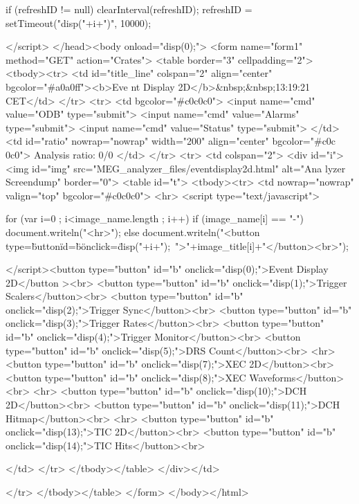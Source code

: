 \begin{DoxyCode}
{    if (refreshID != null)
      clearInterval(refreshID);
    refreshID = setTimeout("disp("+i+")", 10000);
  }
  
  </script>
  </head><body onload="disp(0);">
    <form name="form1" method="GET" action="Crates">
      <table border="3" cellpadding="2">
        <tbody><tr>
          <td id="title_line" colspan="2" align="center" bgcolor="#a0a0ff"><b>Eve
      nt Display 2D</b>&nbsp;&nbsp;13:19:21  CET</td>
        </tr>
        <tr>
          <td bgcolor="#c0c0c0">
            <input name="cmd" value="ODB" type="submit">
            <input name="cmd" value="Alarms" type="submit">
            <input name="cmd" value="Status" type="submit">
          </td>
          <td id="ratio" nowrap="nowrap" width="200" align="center" bgcolor="#c0c
      0c0">
            Analysis ratio: 0/0
          </td>
        </tr>  
        <tr>
          <td colspan="2">
            <div id="i">
              <img id="img" src="MEG_analyzer_files/eventdisplay2d.html" alt="Ana
      lyzer Screendump" border="0">
              <table id="t">
                <tbody><tr>
                  <td nowrap="nowrap" valign="top" bgcolor="#c0c0c0">
                    <hr>
<script type="text/javascript">

  for (var i=0 ; i<image_name.length ; i++)
    if (image_name[i] == "-")
       document.writeln("<hr>");
    else
       document.writeln("<button type=\"button\" id=\"b\" onclick=\"disp("+i+");\
      ">"+image_title[i]+"</button><br>");

</script><button type="button" id="b" onclick="disp(0);">Event Display 2D</button
      ><br>
<button type="button" id="b" onclick="disp(1);">Trigger Scalers</button><br>
<button type="button" id="b" onclick="disp(2);">Trigger Sync</button><br>
<button type="button" id="b" onclick="disp(3);">Trigger Rates</button><br>
<button type="button" id="b" onclick="disp(4);">Trigger Monitor</button><br>
<button type="button" id="b" onclick="disp(5);">DRS Count</button><br>
<hr>
<button type="button" id="b" onclick="disp(7);">XEC 2D</button><br>
<button type="button" id="b" onclick="disp(8);">XEC Waveforms</button><br>
<hr>
<button type="button" id="b" onclick="disp(10);">DCH 2D</button><br>
<button type="button" id="b" onclick="disp(11);">DCH Hitmap</button><br>
<hr>
<button type="button" id="b" onclick="disp(13);">TIC 2D</button><br>
<button type="button" id="b" onclick="disp(14);">TIC Hits</button><br>

                  </td>
                </tr>
              </tbody></table>
            </div></td>
          
        </tr>
      </tbody></table>
    </form>
  </body></html>
\end{DoxyCode}


